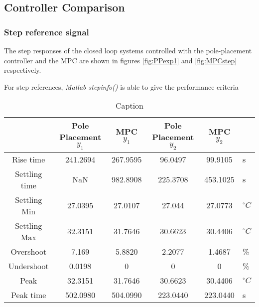 \subsection{Controller Comparison}





\subsubsection{Step reference signal}

The step responses of the closed loop systems controlled with the pole-placement controller and the MPC are shown in figures \ref{fig:PPexp1} and \ref{fig:MPCstep} respectively.


For step references, \textit{Matlab stepinfo()} is able to give the performance criteria
\begin{table}[]
    \centering
    \begin{tabular}{c|c|c|c|c|l}
         & Pole Placement $y_1$ & MPC $y_1$ & Pole Placement $y_2$ & MPC $y_2$ &  \\
        \hline
        Rise time & 241.2694 & 267.9595 & 96.0497 & 99.9105 & s\\
        Settling time & NaN & 982.8908 & 225.3708 & 453.1025 & s\\
        Settling Min & 27.0395 & 27.0107 & 27.044 & 27.0773 & $^{\circ}C$\\
        Settling Max & 32.3151 & 31.7646 & 30.6623 & 30.4406 & $^{\circ}C$\\
        Overshoot & 7.169 & 5.8820 & 2.2077 & 1.4687 & \%\\
        Undershoot & 0.0198 & 0 & 0 & 0& \% \\
        Peak & 32.3151 & 31.7646 & 30.6623 & 30.4406 & $^{\circ}C$\\
        Peak time & 502.0980 & 504.0990 & 223.0440 & 223.0440 & s 
    \end{tabular}
    \caption{Caption}
    \label{tab:my_label}
\end{table}

